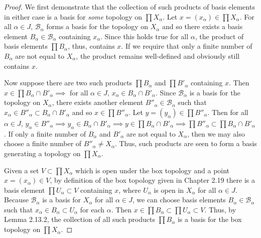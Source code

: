 \documentclass[a4paper,10pt]{article}
\begin{document}
\begin{solution}
    \begin{proof}
        We first demonstrate that the collection of such products of basis elements in either case is a basis for \textit{some} topology on $\prod X_\alpha$.
        Let $x = (x_\alpha) \in \prod X_\alpha$.
        For all $\alpha \in J$, $\mathscr{B}_\alpha$ forms a basis for the topology on $X_\alpha$ and so there exists a basis element $B_\alpha \in \mathscr{B}_\alpha$ containing $x_\alpha$.
        Since this holds true for all $\alpha$, the product of basis elements $\prod B_\alpha$, thus, contains $x$.
        If we require that only a finite number of $B_\alpha$ are not equal to $X_\alpha$, the product remains well-defined and obviously still contains $x$.

        Now suppose there are two such products $\prod B_\alpha$ and $\prod B'_\alpha$ containing $x$.
        Then $x \in \prod B_\alpha \cap B'_\alpha \implies$ for all $\alpha \in J$, $x_\alpha \in B_\alpha \cap B'_\alpha$.
        Since $\mathscr{B}_\alpha$ is a basis for the topology on $X_\alpha$, there exists another element $B''_\alpha \in \mathscr{B}_\alpha$ such that $x_\alpha \in B''_\alpha \subset B_\alpha \cap B'_\alpha$ and so $x \in \prod B''_\alpha$.
        Let $y = (y_\alpha) \in \prod B''_\alpha$.
        Then for all $\alpha \in J$, $y_\alpha \in B''_\alpha \implies y_\alpha \in B_\alpha \cap B'_\alpha \implies y \in \prod B_\alpha \cap B'_\alpha \implies \prod B''_\alpha \subset \prod B_\alpha \cap B'_\alpha$.
        If only a finite number of $B_\alpha$ and $B'_\alpha$ are not equal to $X_\alpha$, then we may also choose a finite number of $B''_\alpha \neq X_\alpha$.
        Thus, such products are seen to form a basis generating a topology on $\prod X_\alpha$.

        Given a set $V \subset \prod X_\alpha$ which is open under the box topology and a point $x = (x_\alpha) \in V$, by definition of the box topology given in Chapter 2.19 there is a basis element $\prod U_\alpha \subset V$ containing $x$, where $U_\alpha$ is open in $X_\alpha$ for all $\alpha \in J$.
        Because $\mathscr{B}_\alpha$ is a basis for $X_\alpha$ for all $\alpha \in J$, we can choose basis elements $B_\alpha \in \mathscr{B}_\alpha$ such that $x_\alpha \in B_\alpha \subset U_\alpha$ for each $\alpha$.
        Then $x \in \prod B_\alpha \subset \prod U_\alpha \subset V$.
        Thus, by Lemma 2.13.2, the collection of all such products $\prod B_\alpha$ is a basis for the box topology on $\prod X_\alpha$.


\end{proof}
\end{solution}
\end{document}
